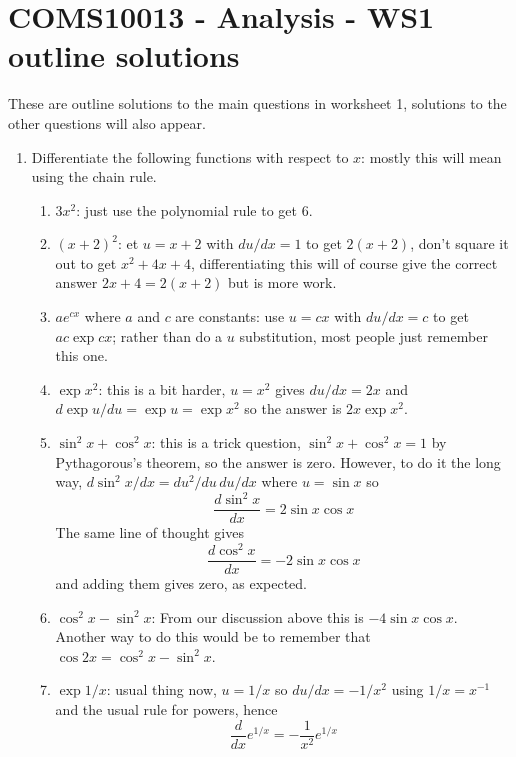 \documentclass[11pt,a4paper]{scrartcl}
\begin{document}
\section*{COMS10013 - Analysis - WS1 outline solutions}

These are outline solutions to the main questions in worksheet 1, solutions to the other questions will also appear.



\begin{enumerate}

\item Differentiate the following functions with respect to $x$: mostly this will mean using the chain rule.
\begin{enumerate}
\item $3x^2$: just use the polynomial rule to get $6$.
\item $(x+2)^2$: et $u=x+2$ with $du/dx=1$ to get $2(x+2)$, don't square it out to get $x^2+4x+4$, differentiating this will of course give the correct answer $2x+4=2(x+2)$ but is more work.
\item $ae^{cx}$ where $a$ and $c$ are constants: use $u=cx$ with $du/dx=c$ to get $ac\exp{cx}$; rather than do a $u$ substitution, most people just remember this one.
\item $\exp{x^2}$: this is a bit harder, $u=x^2$ gives $du/dx=2x$ and $d\exp{u}/du=\exp{u}=\exp{x^2}$ so the answer is $2x\exp{x^2}$.
\item $\sin^2{x}+\cos^2{x}$: this is a trick question, $\sin^2{x}+\cos^2{x}=1$ by Pythagorous's theorem, so the answer is zero. However, to do it the long way, $d\sin^2{x}/dx=du^2/du\,du/dx$ where $u=\sin{x}$ so
  \begin{equation}
    \frac{d\sin^2{x}}{dx}=2\sin{x}\cos{x}
  \end{equation}
  The same line of thought gives
  \begin{equation}
    \frac{d\cos^2{x}}{dx}=-2\sin{x}\cos{x}
  \end{equation}
  and adding them gives zero, as expected.
\item $\cos^2{x}-\sin^2{x}$: From our discussion above this is $-4\sin{x}\cos{x}$. Another way to do this would be to remember that $\cos{2x}=\cos^2{x}-\sin^2{x}$.
\item $\exp{1/x}$: usual thing now, $u=1/x$ so $du/dx=-1/x^2$ using $1/x=x^{-1}$ and the usual rule for powers, hence
  \begin{equation}
    \frac{d}{dx}e^{1/x}=-\frac{1}{x^2}e^{1/x}
  \end{equation}
\end{enumerate}


\end{enumerate}
\end{document}
